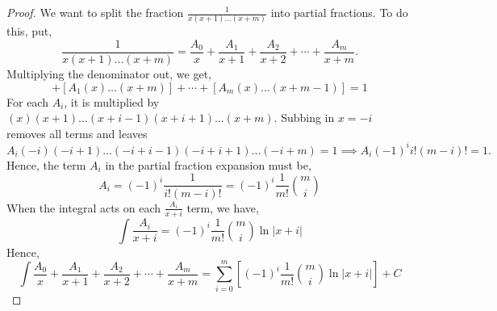 \documentclass[12pt,a4paper]{article}
\newtheorem{proof}{Proof}
\begin{document}
\begin{enumerate}[a.]
         
         \begin{proof}
         We want to split the fraction $\frac{1}{x(x+1)...(x+m)}$ into partial fractions. To do this, put,
         \begin{equation*}
             \frac{1}{x(x+1)...(x+m)} = \frac{A_0}{x} + \frac{A_1}{x+1} + \frac{A_2}{x+2} + \cdots + \frac{A_m}{ x+m}.
         \end{equation*}
         Multiplying the denominator out, we get,
         \begin{equation*}
             [A_0(x+1)...(x+m)] + [A_1(x)...(x+m)] + \cdots + [A_m(x)...(x+m-1)] = 1
         \end{equation*}
         For each $A_i$, it is multiplied by $(x)(x+1)...(x+i-1)(x+i+1)...(x+m)$. Subbing in $x=-i$ removes all terms and leaves
         \begin{equation*}
             A_i(-i)(-i+1)...(-i+i-1)(-i+i+1)...(-i+m)=1 \implies A_i (-1)^i i!(m-i)! = 1.
         \end{equation*}
         Hence, the term $A_i$ in the partial fraction expansion must be,
         \begin{equation*}
             A_i = (-1)^i \frac{1}{i!(m-i)!} = (-1)^i \frac{1}{m!} \binom{m}{i}
         \end{equation*}
         When the integral acts on each $\frac{A_i}{x+i}$ term, we have,
         \begin{equation*}
             \int \frac{A_i}{x+i} = (-1)^i \frac{1}{m!} \binom{m}{i} \ln|x+i|
         \end{equation*}
         Hence, 
         \begin{equation*}
             \int \frac{A_0}{x} + \frac{A_1}{x+1} + \frac{A_2}{x+2} + \cdots + \frac{A_m}{x+m} = \sum_{i=0}^m \left[(-1)^i \frac{1}{m!} \binom{m}{i} \ln|x+i|\right] + C
         \end{equation*}
         \end{proof}
       
    \end{enumerate}
\end{document}
